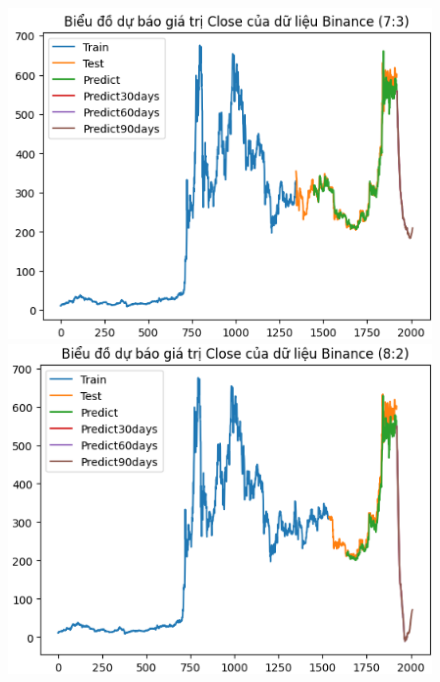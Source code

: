 \documentclass[conference]{IEEEtran}
\begin{document}
\begin{figure}[H]
    \centering
    \begin{minipage}{0.15\textwidth}
    \centering
    \includegraphics[width=1\textwidth]{Figure/BNB73.png}
    \end{minipage}
    \hfill
    \begin{minipage}{0.15\textwidth}
    \centering
    \includegraphics[width=1\textwidth]{Figure/BNB82.png}
    \end{minipage}
    \hfill
    \begin{minipage}{0.15\textwidth}
    \centering

\end{minipage}
\end{figure}
\end{document}
